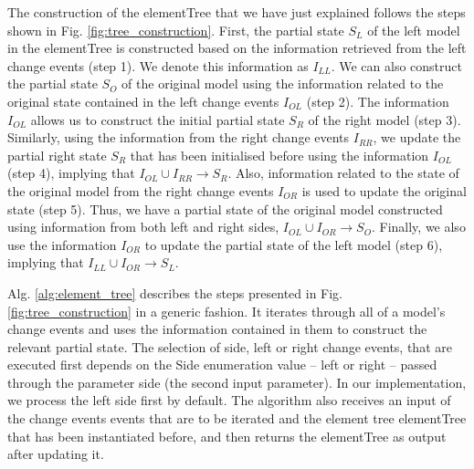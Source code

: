 \documentclass{jot}
\newcommand{\dk}[1]{\textcolor{blue}{\textbf{[Dimitris: #1]}}}
\begin{document}
    The construction of the \textsf{elementTree} that we have just explained follows the steps shown in Fig. \ref{fig:tree_construction}. First, the partial
    state $S_{L}$ of the left model in the \textsf{elementTree} is constructed based on the information retrieved from the left change events (step 1). We denote this information as $I_{LL}$. We can also construct the partial 
    state $S_{O}$ of the original model using the information related to the original state contained in the left change events $I_{OL}$ (step 2). The information $I_{OL}$ allows us to construct the initial partial 
    state $S_{R}$ of the right model 
    (step 3). Similarly, using the information from the right change events $I_{RR}$, we update the partial right state $S_{R}$ that has been initialised before using the information $I_{OL}$ (step 4), implying that $I_{OL} \cup I_{RR} \rightarrow S_{R}$. Also, information related to the state of the original model from the right change events $I_{OR}$ is used to update the original state  (step 5). Thus, we have a partial state of the original model constructed using information from both left and right sides, $I_{OL} \cup I_{OR} \rightarrow S_{O}$. Finally, we also use the information $I_{OR}$ to update the partial state of the left model (step 6), implying that $I_{LL} \cup I_{OR} \rightarrow S_{L}$.  
    
    Alg. \ref{alg:element_tree} describes the steps presented in Fig. \ref{fig:tree_construction} in a generic fashion. It iterates through all of a model's change events and uses the information contained in them to construct the relevant partial state. The selection of side, left or right change events, that are executed first depends on the \textsf{Side} enumeration value -- \textsf{left} or \textsf{right} -- passed through the parameter \textsf{side} (the second input parameter). In our implementation, we process the left side first by default. The algorithm also receives an input of the change events \textsf{events} that are to be iterated and the element tree \textsf{elementTree} that has been instantiated before, and then returns the \textsf{elementTree} as output after updating it.
    
\end{document}

